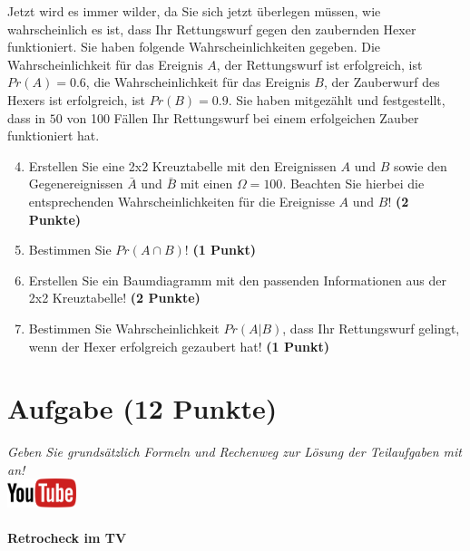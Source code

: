 \documentclass[a4paper, 9pt]{scrartcl}\usepackage[]{graphicx}\usepackage[]{xcolor}
\begin{document}
Jetzt wird es immer wilder, da Sie sich jetzt {\"u}berlegen m{\"u}ssen, wie
wahrscheinlich es ist, dass Ihr Rettungswurf gegen den zaubernden Hexer
funktioniert. Sie haben folgende Wahrscheinlichkeiten gegeben. Die
Wahrscheinlichkeit f{\"u}r das Ereignis $A$, der Rettungswurf ist erfolgreich,
ist $Pr(A) = 0.6$, die Wahrscheinlichkeit f{\"u}r das Ereignis $B$,
der Zauberwurf des Hexers ist erfolgreich, ist $Pr(B) = 0.9$. Sie
haben mitgez{\"a}hlt und festgestellt, dass in $50$ von 100 F{\"a}llen
Ihr Rettungswurf bei einem erfolgeichen Zauber funktioniert hat.  

\begin{enumerate}
  \setcounter{enumi}{3}
\item Erstellen Sie eine 2x2 Kreuztabelle mit den Ereignissen $A$ und $B$
  sowie den Gegenereignissen $\bar{A}$ und $\bar{B}$ mit einen
  $\Omega = 100$. Beachten Sie hierbei die entsprechenden
  Wahrscheinlichkeiten f{\"u}r die Ereignisse $A$ und $B$! \textbf{(2 Punkte)}
\item Bestimmen Sie $Pr(A \cap B)$! \textbf{(1 Punkt)}
\item Erstellen Sie ein Baumdiagramm mit den passenden Informationen aus der 2x2
  Kreuztabelle! \textbf{(2 Punkte)}
\item Bestimmen Sie Wahrscheinlichkeit $Pr(A|B)$, dass Ihr Rettungswurf gelingt, wenn
  der Hexer erfolgreich gezaubert hat! \textbf{(1 Punkt)}
\end{enumerate}

  
\clearpage

\section{Aufgabe \hfill (12 Punkte)}

\textit{Geben Sie grunds{\"a}tzlich Formeln und Rechenweg zur L{\"o}sung der
  Teilaufgaben mit an!} \\[1Ex]

\hfill\href{https://youtu.be/9DQKaXdxT_g}{\includegraphics[width =
  2cm]{img/youtube}} %
\hspace{2Ex}

\paragraph{Retrocheck im TV}
\end{document}
